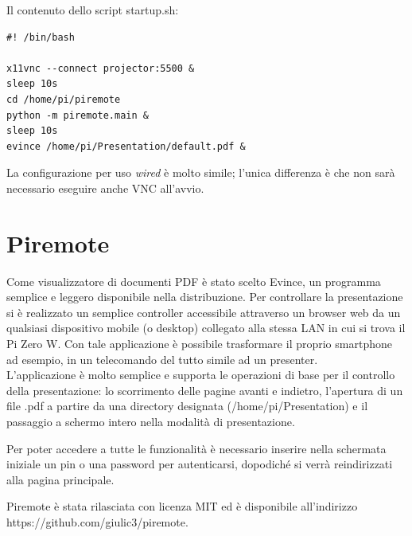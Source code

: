 \noindent Il contenuto dello script startup.sh:
\begin{lstlisting}
#! /bin/bash

x11vnc --connect projector:5500 &
sleep 10s
cd /home/pi/piremote
python -m piremote.main &
sleep 10s
evince /home/pi/Presentation/default.pdf &

\end{lstlisting}



La configurazione per uso \textit{wired} è molto simile; l'unica differenza è che non sarà necessario eseguire anche VNC all'avvio.\\
\section{Piremote}
Come visualizzatore di documenti PDF è stato scelto Evince, un programma semplice e leggero disponibile nella distribuzione.
Per controllare la presentazione si è realizzato un semplice controller accessibile attraverso un browser web da un qualsiasi dispositivo mobile (o desktop) collegato alla stessa LAN in cui si trova il Pi Zero W. Con tale applicazione è possibile trasformare il proprio smartphone ad esempio, in un telecomando del tutto simile ad un presenter. \\
L'applicazione è molto semplice e supporta le operazioni di base per il controllo della presentazione: lo scorrimento delle pagine avanti e indietro, l'apertura di un file .pdf a partire da una directory designata (/home/pi/Presentation) e il passaggio a schermo intero nella modalità di presentazione.

Per poter accedere a tutte le funzionalità è necessario inserire nella schermata iniziale un pin o una password per autenticarsi, dopodiché si verrà reindirizzati alla pagina principale.

Piremote è stata rilasciata con licenza MIT ed è disponibile all'indirizzo https://github.com/giulic3/piremote.

